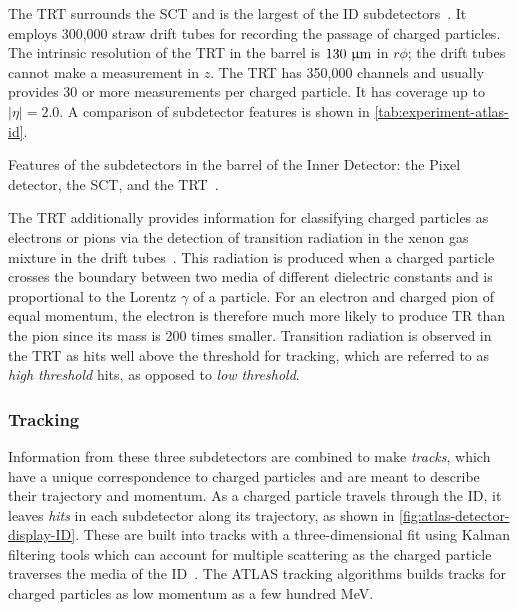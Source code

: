 The TRT surrounds the SCT and is the largest of the ID subdetectors~\cite{cern-jinst-atlas}. It employs 300,000 straw drift tubes for recording the passage of charged particles. The intrinsic resolution of the TRT in the barrel is $130\ \micron$ in $r\phi$; the drift tubes cannot make a measurement in $z$. The TRT has 350,000 channels and usually provides 30 or more measurements per charged particle. It has coverage up to $|\eta|=2.0$. A comparison of subdetector features is shown in \cref{tab:experiment-atlas-id}.

\begin{table}[bp]
  \centering
  \renewcommand{\arraystretch}{1.2}
  \caption{Features of the subdetectors in the barrel of the Inner Detector: the Pixel detector, the SCT, and the TRT~\cite{ATLAS-CONF-2014-047}.}
  
  \label{tab:experiment-atlas-id}
\end{table}

The TRT additionally provides information for classifying charged particles as electrons or pions via the detection of transition radiation in the xenon gas mixture in the drift tubes~\cite{ATLAS-CONF-2011-128}. This radiation is produced when a charged particle crosses the boundary between two media of different dielectric constants and is proportional to the Lorentz $\gamma$ of a particle. For an electron and charged pion of equal momentum, the electron is therefore much more likely to produce TR than the pion since its mass is 200 times smaller. Transition radiation is observed in the TRT as hits well above the threshold for tracking, which are referred to as \textit{high threshold} hits, as opposed to \textit{low threshold}.

\subsubsection{Tracking}

Information from these three subdetectors are combined to make \textit{tracks}, which have a unique correspondence to charged particles and are meant to describe their trajectory and momentum. As a charged particle travels through the ID, it leaves \textit{hits} in each subdetector along its trajectory, as shown in \cref{fig:atlas-detector-display-ID}. These are built into tracks with a three-dimensional fit using Kalman filtering tools which can account for multiple scattering as the charged particle traverses the media of the ID~\cite{ATLAS-CONF-2014-047,ATLAS-CONF-2012-042}. The ATLAS tracking algorithms builds tracks for charged particles as low momentum as a few hundred MeV.


